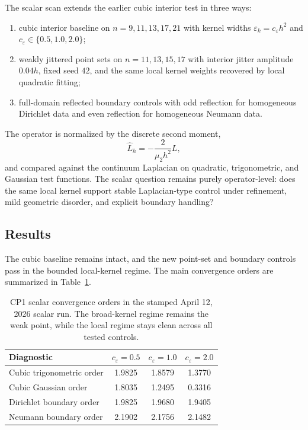 \documentclass[11pt]{article}
\begin{document}
The scalar scan extends the earlier cubic interior test in three ways:
\begin{enumerate}
\item cubic interior baseline on $n=9,11,13,17,21$ with kernel widths $\varepsilon_k = c_\varepsilon h^2$ and $c_\varepsilon \in \{0.5,1.0,2.0\}$;
\item weakly jittered point sets on $n=11,13,15,17$ with interior jitter amplitude $0.04h$, fixed seed $42$, and the same local kernel weights recovered by local quadratic fitting;
\item full-domain reflected boundary controls with odd reflection for homogeneous Dirichlet data and even reflection for homogeneous Neumann data.
\end{enumerate}

The operator is normalized by the discrete second moment,
\[
\widehat{L}_h = -\frac{2}{\mu_2 h^2} L,
\]
and compared against the continuum Laplacian on quadratic, trigonometric, and Gaussian test functions. The scalar question remains purely operator-level: does the same local kernel support stable Laplacian-type control under refinement, mild geometric disorder, and explicit boundary handling?

\subsection{Results}

The cubic baseline remains intact, and the new point-set and boundary controls pass in the bounded local-kernel regime. The main convergence orders are summarized in Table~\ref{tab:cp1-orders}.

\begin{table}[t]
\centering
\small
\begin{tabular}{lccc}
\toprule
Diagnostic & $c_\varepsilon=0.5$ & $c_\varepsilon=1.0$ & $c_\varepsilon=2.0$ \\
\midrule
Cubic trigonometric order & 1.9825 & 1.8579 & 1.3770 \\
Cubic Gaussian order & 1.8035 & 1.2495 & 0.3316 \\
Dirichlet boundary order & 1.9825 & 1.9680 & 1.9405 \\
Neumann boundary order & 2.1902 & 2.1756 & 2.1482 \\
\bottomrule
\end{tabular}
\caption{CP1 scalar convergence orders in the stamped April 12, 2026 scalar run. The broad-kernel regime remains the weak point, while the local regime stays clean across all tested controls.}
\label{tab:cp1-orders}
\end{table}
\end{document}
